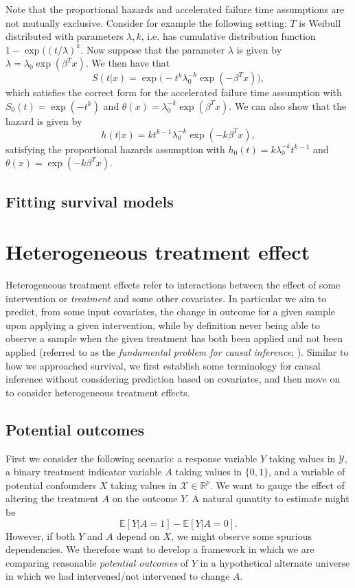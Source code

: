 \documentclass[../thesis.tex]{subfiles}
\begin{document}
Note that the proportional hazards and accelerated failure time assumptions are not mutually exclusive. Consider for example the following setting: $T$ is Weibull distributed with parameters $\lambda, k$, i.e. has cumulative distribution function $1- \exp((t/\lambda)^k$. Now suppose that the parameter $\lambda$ is given by $\lambda = \lambda_0 \exp(\beta^T x)$. We then have that 
\[S(t|x) = \exp\big(-t^k\lambda_0^{-k}\exp( -\beta^Tx)\big), \]
which satisfies the correct form for the accelerated failure time assumption with $S_0(t) = \exp(-t^k)$ and $\theta(x) = \lambda_0^{-k}\exp(\beta^Tx)$. We can also show that the hazard is given by 
\[h(t|x) = kt^{k-1}\lambda_0^{-k} \exp(-k\beta^Tx), \]
satisfying the proportional hazards assumption with $h_0(t) = k\lambda_0^{-k}t^{k-1}$ and $\theta(x) = \exp(-k\beta^Tx)$. 

\subsection{Fitting survival models}

\section{Heterogeneous treatment effect}
Heterogeneous treatment effects refer to interactions between the effect of some intervention or \emph{treatment} and some other covariates. In particular we aim to predict, from some input covariates, the change in outcome for a given sample upon applying a given intervention, while by definition never being able to observe a sample when the given treatment has both been applied and not been applied (referred to as the \emph{fundamental problem for causal inference}; \citealp{holland_statistics_1986}). Similar to how we approached survival, we first establish some terminology for causal inference without considering prediction based on covariates, and then move on to consider heterogeneous treatment effects.

\subsection{Potential outcomes}
First we consider the following scenario: a response variable $Y$ taking values in $\mathcal{Y}$, a binary treatment indicator variable $A$ taking values in $\{0,1\}$, and a variable of potential confounders $X$ taking values in $\mathcal{X} \in \mathbb{R}^p$. We want to gauge the effect of altering the treatment $A$ on the outcome $Y$. A natural quantity to estimate might be
\[\mathbb{E}[Y | A = 1] - \mathbb{E}[Y | A = 0].\]
However, if both $Y$ and $A$ depend on $X$, we might observe some spurious dependencies. We therefore want to develop a framework in which we are comparing reasonable \emph{potential outcomes} of $Y$ in a hypothetical alternate universe in which we had intervened/not intervened to change $A$.
\end{document}
